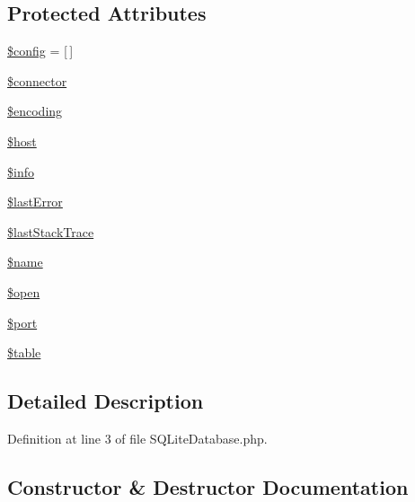 \subsection*{Protected Attributes}
\begin{DoxyCompactItemize}
\item 
\hyperlink{class_s_q_lite_database_a49c7011be9c979d9174c52a8b83e5d8e}{\$config} = \mbox{[}$\,$\mbox{]}
\item 
\hyperlink{class_s_q_lite_database_a7c7a1968b87fd4d016e364b27b7a3d7d}{\$connector}
\item 
\hyperlink{class_s_q_lite_database_aee271b7ce67fbe00b9976e6c347cbfbf}{\$encoding}
\item 
\hyperlink{class_s_q_lite_database_a711797613cb863ca0756df789c396bf2}{\$host}
\item 
\hyperlink{class_s_q_lite_database_ae19722790c6683980bbf0af8572f26ab}{\$info}
\item 
\hyperlink{class_s_q_lite_database_a6cb6be70a528323568af007db6a3885e}{\$last\+Error}
\item 
\hyperlink{class_s_q_lite_database_a12ff8f78a47e0fa691355a485c2e696a}{\$last\+Stack\+Trace}
\item 
\hyperlink{class_s_q_lite_database_ab2fc40d43824ea3e1ce5d86dee0d763b}{\$name}
\item 
\hyperlink{class_s_q_lite_database_a4269f690c0554ecb1deec21b80f321dc}{\$open}
\item 
\hyperlink{class_s_q_lite_database_aa0787efab4b22e8a212882f3409d4c77}{\$port}
\item 
\hyperlink{class_s_q_lite_database_ae8876a14058f368335baccf35af4a22b}{\$table}
\end{DoxyCompactItemize}


\subsection{Detailed Description}


Definition at line 3 of file S\+Q\+Lite\+Database.\+php.



\subsection{Constructor \& Destructor Documentation}
\hypertarget{class_s_q_lite_database_a98c33e722c2aeac0d41ff40cfb705f5e}{}
